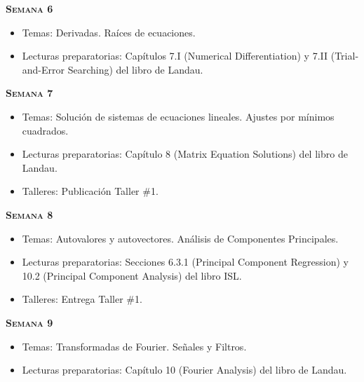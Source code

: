 \documentclass[letterpaper,10pt,onecolumn]{article}
\begin{document}
\noindent\textbf{\textsc{Semana 6}}\\[-0.5cm]
\begin{itemize}
\item Temas: Derivadas. Ra\'ices de ecuaciones. \\[-0.6cm]
\item Lecturas preparatorias: Cap\'itulos 7.I (Numerical
  Differentiation) y 7.II (Trial-and-Error Searching) del libro de
  Landau.\\[-0.6cm] 
\end{itemize}

\noindent\textbf{\textsc{Semana 7}}\\[-0.5cm]
\begin{itemize}
\item Temas: Soluci\'on de sistemas de ecuaciones lineales. Ajustes
  por m\'inimos cuadrados. \\[-0.6cm] 
\item Lecturas preparatorias:  Cap\'itulo 8 (Matrix Equation Solutions)
  del libro de Landau. \\[-0.6cm]
\item Talleres: Publicaci\'on Taller \#1. \\[-0.6cm]
\end{itemize}


\noindent\textbf{\textsc{Semana 8}}\\[-0.5cm]
\begin{itemize}
\item Temas: Autovalores y autovectores. 
An\'alisis de Componentes Principales. \\[-0.6cm]
\item Lecturas preparatorias: Secciones 6.3.1 (Principal Component
  Regression) y 10.2 (Principal Component Analysis) del libro ISL.\\[-0.6cm]
\item Talleres: Entrega Taller \#1. \\[-0.6cm]
\end{itemize}

\noindent\textbf{\textsc{Semana 9}}\\[-0.5cm]
\begin{itemize}
\item Temas: Transformadas de Fourier. Se\~nales y Filtros. \\[-0.6cm]
\item Lecturas preparatorias: Cap\'itulo 10 (Fourier Analysis) del
  libro de Landau.\\[-0.6cm] 
\end{itemize}
\end{document}
